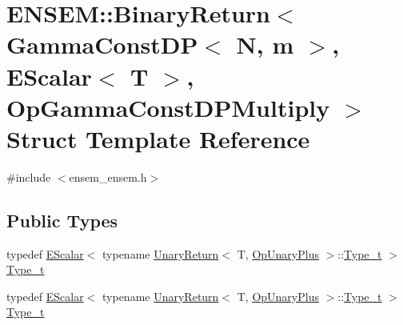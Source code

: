 \hypertarget{structENSEM_1_1BinaryReturn_3_01GammaConstDP_3_01N_00_01m_01_4_00_01EScalar_3_01T_01_4_00_01OpGammaConstDPMultiply_01_4}{}\section{E\+N\+S\+EM\+:\+:Binary\+Return$<$ Gamma\+Const\+DP$<$ N, m $>$, E\+Scalar$<$ T $>$, Op\+Gamma\+Const\+D\+P\+Multiply $>$ Struct Template Reference}
\label{structENSEM_1_1BinaryReturn_3_01GammaConstDP_3_01N_00_01m_01_4_00_01EScalar_3_01T_01_4_00_01OpGammaConstDPMultiply_01_4}


{\ttfamily \#include $<$ensem\+\_\+ensem.\+h$>$}

\subsection*{Public Types}
\begin{DoxyCompactItemize}
\item 
typedef \mbox{\hyperlink{classENSEM_1_1EScalar}{E\+Scalar}}$<$ typename \mbox{\hyperlink{structENSEM_1_1UnaryReturn}{Unary\+Return}}$<$ T, \mbox{\hyperlink{structENSEM_1_1OpUnaryPlus}{Op\+Unary\+Plus}} $>$\+::\mbox{\hyperlink{structENSEM_1_1BinaryReturn_3_01GammaConstDP_3_01N_00_01m_01_4_00_01EScalar_3_01T_01_4_00_01OpGammaConstDPMultiply_01_4_a27aeae298785ac9baf364166d0cdb469}{Type\+\_\+t}} $>$ \mbox{\hyperlink{structENSEM_1_1BinaryReturn_3_01GammaConstDP_3_01N_00_01m_01_4_00_01EScalar_3_01T_01_4_00_01OpGammaConstDPMultiply_01_4_a27aeae298785ac9baf364166d0cdb469}{Type\+\_\+t}}
\item 
typedef \mbox{\hyperlink{classENSEM_1_1EScalar}{E\+Scalar}}$<$ typename \mbox{\hyperlink{structENSEM_1_1UnaryReturn}{Unary\+Return}}$<$ T, \mbox{\hyperlink{structENSEM_1_1OpUnaryPlus}{Op\+Unary\+Plus}} $>$\+::\mbox{\hyperlink{structENSEM_1_1BinaryReturn_3_01GammaConstDP_3_01N_00_01m_01_4_00_01EScalar_3_01T_01_4_00_01OpGammaConstDPMultiply_01_4_a27aeae298785ac9baf364166d0cdb469}{Type\+\_\+t}} $>$ \mbox{\hyperlink{structENSEM_1_1BinaryReturn_3_01GammaConstDP_3_01N_00_01m_01_4_00_01EScalar_3_01T_01_4_00_01OpGammaConstDPMultiply_01_4_a27aeae298785ac9baf364166d0cdb469}{Type\+\_\+t}}
\end{DoxyCompactItemize}


